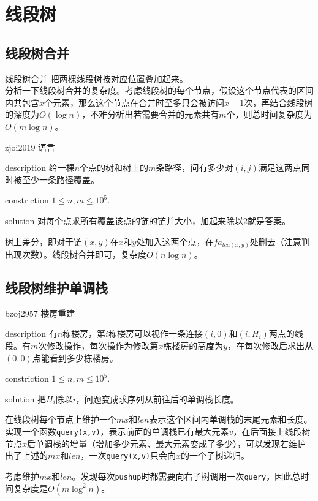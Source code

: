 \documentclass{beamer}
\begin{document}
	\section{线段树}
	\subsection{线段树合并}
	\begin{frame}{线段树合并}
		把两棵线段树按对应位置叠加起来。\\
		
		分析一下线段树合并的复杂度。考虑线段树的每个节点，假设这个节点代表的区间内共包含$x$个元素，那么这个节点在合并时至多只会被访问$x-1$次，再结合线段树的深度为$O(\log n)$，不难分析出若需要合并的元素共有$m$个，则总时间复杂度为$O(m\log n)$。
	\end{frame}
	\begin{frame}{zjoi2019 语言}
		\begin{block}{description}
			给一棵$n$个点的树和树上的$m$条路径，问有多少对$(i,j)$满足这两点同时被至少一条路径覆盖。
		\end{block}
		\begin{block}{constriction}
			$1 \le n, m \le 10^5.$
		\end{block}
		\pause
		\begin{block}{solution}
			对每个点求所有覆盖该点的链的链并大小，加起来除以$2$就是答案。
			
			树上差分，即对于链$(x,y)$在$x$和$y$处加入这两个点，在$fa_{lca(x,y)}$处删去（注意判出现次数）。线段树合并即可，复杂度$O(n\log n)$。
			
		\end{block}
	\end{frame}
	\subsection{线段树维护单调栈}
	\begin{frame}{bzoj2957 楼房重建}
		\begin{block}{description}
			有$n$栋楼房，第$i$栋楼房可以视作一条连接$(i,0)$和$(i,H_i)$两点的线段。有$m$次修改操作，每次操作为修改第$x$栋楼房的高度为$y$，在每次修改后求出从$(0,0)$点能看到多少栋楼房。
		\end{block}
		\begin{block}{constriction}
			$1 \le n, m \le 10^5.$
		\end{block}
		\pause
		\begin{block}{solution}
			把$H_i$除以$i$，问题变成求序列从前往后的单调栈长度。
			
			在线段树每个节点上维护一个$mx$和$len$表示这个区间内单调栈的末尾元素和长度。实现一个函数\texttt{query(x,v)}，表示前面的单调栈已有最大元素$v$，在后面接上线段树节点$x$后单调栈的增量（增加多少元素、最大元素变成了多少），可以发现若维护出了上述的$mx$和$len$，一次\texttt{query(x,v)}只会向$x$的一个子树递归。
			
			考虑维护$mx$和$len$。发现每次\texttt{pushup}时都需要向右子树调用一次\texttt{query}，因此总时间复杂度是$O(m\log^2n)$。
		\end{block}
	\end{frame}
\end{document}
